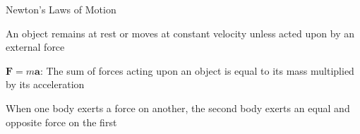 \begin{frame}{Newton's Laws of Motion}
	\begin{center}
		\pause An object remains at rest or moves at constant velocity unless acted upon by an external force
		
		\vspace{2ex}
		
		\pause $\boldsymbol{F} = m\boldsymbol{a}$: The sum of forces acting upon an object is equal to its mass multiplied by its acceleration
		
		\vspace{2ex}
		
		\pause When one body exerts a force on another, the second body exerts an equal and opposite force on the first
	\end{center}
\end{frame}

